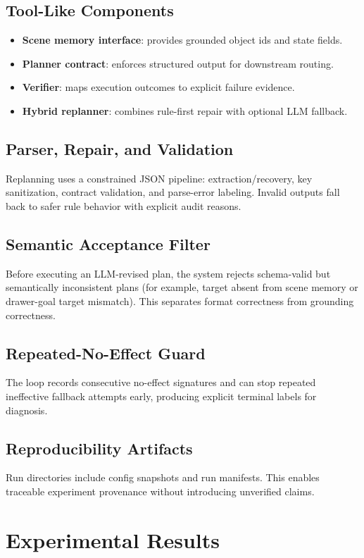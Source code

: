 \documentclass{article}
\begin{document}
\subsection{Tool-Like Components}
\begin{itemize}[leftmargin=*]
  \item \textbf{Scene memory interface}: provides grounded object ids and state fields.
  \item \textbf{Planner contract}: enforces structured output for downstream routing.
  \item \textbf{Verifier}: maps execution outcomes to explicit failure evidence.
  \item \textbf{Hybrid replanner}: combines rule-first repair with optional LLM fallback.
\end{itemize}

\subsection{Parser, Repair, and Validation}
Replanning uses a constrained JSON pipeline: extraction/recovery, key sanitization, contract validation, and parse-error labeling. Invalid outputs fall back to safer rule behavior with explicit audit reasons.

\subsection{Semantic Acceptance Filter}
Before executing an LLM-revised plan, the system rejects schema-valid but semantically inconsistent plans (for example, target absent from scene memory or drawer-goal target mismatch). This separates format correctness from grounding correctness.

\subsection{Repeated-No-Effect Guard}
The loop records consecutive no-effect signatures and can stop repeated ineffective fallback attempts early, producing explicit terminal labels for diagnosis.

\subsection{Reproducibility Artifacts}
Run directories include config snapshots and run manifests. This enables traceable experiment provenance without introducing unverified claims.

\section{Experimental Results}
\end{document}
